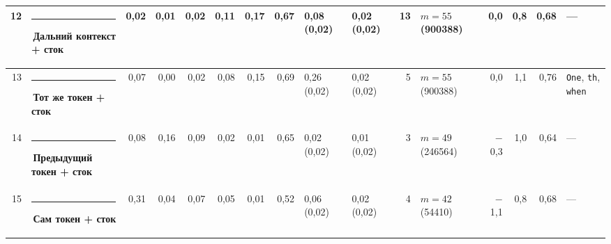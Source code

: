 \documentclass[10pt]{article}
\begin{document}
\begin{minipage}{\linewidth}
\begin{center}
{\begin{tabular}{|r|l|r|r|r|r|r|r|l|l|r|l|r|r|r|l|}
12 & \textcolor[HTML]{C3C2B7}{\rule{0.62em}{0.62em}}\,Дальний контекст + сток & 0,02 & 0,01 & 0,02 & 0,11 & 0,17 & 0,67 & 0,08 (0,02) & 0,02 (0,02) & 13 & $m{=}55$ (900388) & 0,0 & 0,8 & 0,68 & — \\ \hline
13 & \textcolor[HTML]{E87BA4}{\rule{0.62em}{0.62em}}\,\textbf{Тот же токен + сток} & 0,07 & 0,00 & 0,02 & 0,08 & 0,15 & 0,69 & 0,26 (0,02) & 0,02 (0,02) & 5 & $m{=}55$ (900388) & 0,0 & 1,1 & 0,76 & \texttt{\textvisiblespace{}One}, \texttt{th}, \texttt{\textvisiblespace{}when} \\ \hline
14 & \textcolor[HTML]{2A78D6}{\rule{0.62em}{0.62em}}\,\textbf{Предыдущий токен + сток} & 0,08 & 0,16 & 0,09 & 0,02 & 0,01 & 0,65 & 0,02 (0,02) & 0,01 (0,02) & 3 & $m{=}49$ (246564) & $-$0,3 & 1,0 & 0,64 & — \\ \hline
15 & \textcolor[HTML]{2A78D6}{\rule{0.62em}{0.62em}}\,\textbf{Сам токен + сток} & 0,31 & 0,04 & 0,07 & 0,05 & 0,01 & 0,52 & 0,06 (0,02) & 0,02 (0,02) & 4 & $m{=}42$ (54410) & $-$1,1 & 0,8 & 0,68 & — \\ \hline
\hline\end{tabular}}\end{center}
\end{minipage}
\par\vspace{0.4em}
\end{document}
